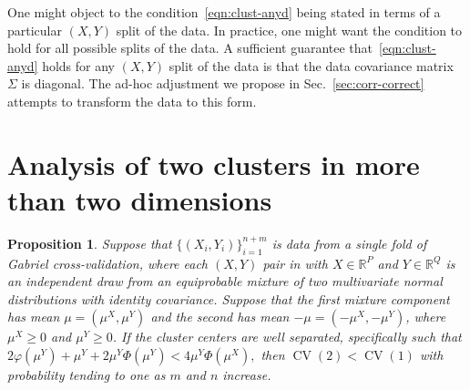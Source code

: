 \documentclass[12pt]{article}
\newtheorem{proposition}{Proposition}
\newcommand{\CV}{\operatorname{CV}}
\newcommand{\muX}{\mu^{X}}
\newcommand{\muY}{\mu^{Y}}
\begin{document}
One might object to the condition~\eqref{eqn:clust-anyd} being stated in terms
of a particular $(X, Y)$ split of the data.  In practice, one might want the
condition to hold for all possible splits of the data. A sufficient guarantee
that~\eqref{eqn:clust-anyd} holds for any $(X, Y)$ split of the data is that
the data covariance matrix $\Sigma$ is diagonal. The ad-hoc adjustment we
propose in Sec.~\ref{sec:corr-correct} attempts to transform the data to this
form.



\section{Analysis of two clusters in more than two dimensions}
\label{app:twoclust-anyd}


\begin{proposition}\label{prop:twoclust-anyd}
Suppose that $\{(X_i,Y_i)\}_{i=1}^{n+m}$ is data from a single fold of Gabriel
    cross-validation, where each $(X,Y)$ pair in with $X \in \mathbb{R}^P$ and $Y \in
    \mathbb{R}^Q$ is an independent draw
from an equiprobable mixture of two multivariate normal distributions with
identity covariance. Suppose that the first mixture component has mean
$\mu = (\muX, \muY)$ and the second has mean $-\mu = (-\muX, -\muY)$,
where $\muX \geq 0$ and $\muY \geq 0$. 
If the cluster centers are well separated, specifically such that
\(
  2 \varphi(\muY) + \muY + 2 \muY \Phi(\muY) < 4 \muY \Phi(\muX),
\)
then $\CV(2) < \CV(1)$ with probability tending to one as $m$ and $n$ increase.
\end{proposition}
\end{document}
